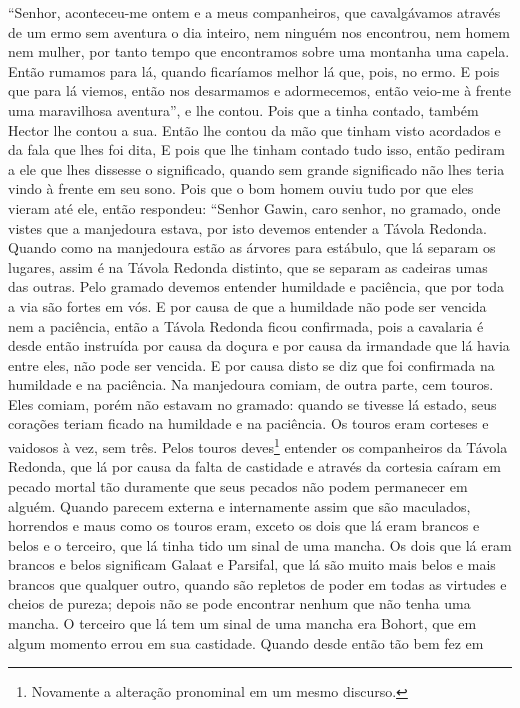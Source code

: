 “Senhor, aconteceu-me ontem e a meus companheiros, que cavalgávamos através de
um ermo sem aventura o dia inteiro, nem ninguém nos encontrou, nem homem nem
mulher, por tanto tempo que encontramos sobre uma montanha uma capela. Então
rumamos para lá, quando ficaríamos melhor lá que, pois, no ermo. E pois que
para lá viemos, então nos desarmamos e adormecemos, então veio-me à frente uma
maravilhosa aventura”, e lhe contou. Pois que a tinha contado, também Hector
lhe contou a sua. Então lhe contou da mão que tinham visto acordados e da fala
que lhes foi dita, E pois que lhe tinham contado tudo isso, então pediram a ele
que lhes dissesse o significado, quando sem grande significado não lhes teria
vindo à frente em seu sono. Pois que o bom homem ouviu tudo por que eles vieram
até ele, então respondeu: “Senhor Gawin, caro senhor, no gramado, onde vistes
que a manjedoura estava, por isto devemos entender a Távola Redonda. Quando
como na manjedoura estão as árvores para estábulo, que lá separam os lugares,
assim é na Távola Redonda distinto, que se separam as cadeiras umas das outras.
Pelo gramado devemos entender humildade e paciência, que por toda a via são
fortes em vós. E por causa de que a humildade não pode ser vencida nem a
paciência, então a Távola Redonda ficou confirmada, pois a cavalaria é desde
então instruída por causa da doçura e por causa da irmandade que lá havia entre
eles, não pode ser vencida. E por causa disto se diz que foi confirmada na
humildade e na paciência. Na manjedoura comiam, de outra parte, cem
touros. Eles comiam, porém não estavam no gramado: quando se tivesse lá estado,
seus corações teriam ficado na humildade e na paciência. Os touros eram
corteses e vaidosos à vez, sem três. Pelos touros deves\footnote{ Novamente a
alteração pronominal em um mesmo discurso.}  entender os
companheiros da Távola Redonda, que lá por causa da falta de castidade e
através da cortesia caíram em pecado mortal tão duramente que seus pecados não
podem permanecer em alguém. Quando parecem externa e internamente assim que são
maculados, horrendos e maus como os touros eram, exceto os dois que lá eram
brancos e belos e o terceiro, que lá tinha tido um sinal de uma mancha. Os dois
que lá eram brancos e belos significam Galaat e Parsifal, que lá são muito
mais belos e mais brancos que qualquer outro, quando são repletos de poder em
todas as virtudes e cheios de pureza; depois não se pode encontrar nenhum que
não tenha uma mancha. O terceiro que lá tem um sinal de uma mancha  era Bohort,
que em algum momento errou em sua castidade. Quando desde então tão bem fez em
